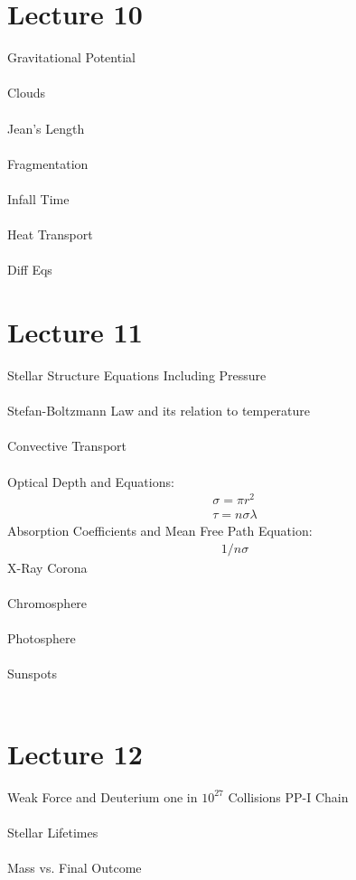 \documentclass[11pt,reqno]{article}
\theoremstyle{definition}
\begin{document}
\section*{Lecture 10}
Gravitational Potential\\\\
Clouds\\\\
Jean's Length\\\\
Fragmentation\\\\
Infall Time\\\\
Heat Transport\\\\
Diff Eqs

\section*{Lecture 11}
Stellar Structure Equations Including Pressure\\\\
Stefan-Boltzmann Law and its relation to temperature\\\\
Convective Transport\\\\
Optical Depth and Equations:
\begin{align*}
    \sigma = \pi r^2\\
    \tau = n\sigma\lambda
\end{align*}
Absorption Coefficients and Mean Free Path Equation:
\begin{align*}
    1 / n\sigma
\end{align*}
X-Ray Corona\\\\
Chromosphere\\\\
Photosphere\\\\
Sunspots\\\\

\section*{Lecture 12}
Weak Force and Deuterium one in $10^{27}$ Collisions
PP-I Chain\\\\
Stellar Lifetimes\\\\
Mass vs. Final Outcome\\\\
\end{document}
